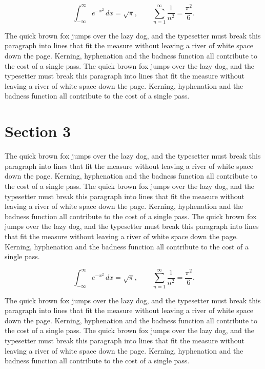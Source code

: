 \documentclass{article}
\begin{document}
\begin{equation}
\int_{-\infty}^{\infty} e^{-x^{2}}\,dx = \sqrt{\pi}, \qquad
\sum_{n=1}^{\infty} \frac{1}{n^{2}} = \frac{\pi^{2}}{6}.
\end{equation}

The quick brown fox jumps over the lazy dog, and the typesetter must break this paragraph into lines that fit the measure without leaving a river of white space down the page. Kerning, hyphenation and the badness function all contribute to the cost of a single pass. The quick brown fox jumps over the lazy dog, and the typesetter must break this paragraph into lines that fit the measure without leaving a river of white space down the page. Kerning, hyphenation and the badness function all contribute to the cost of a single pass. 
\section{Section 3}
The quick brown fox jumps over the lazy dog, and the typesetter must break this paragraph into lines that fit the measure without leaving a river of white space down the page. Kerning, hyphenation and the badness function all contribute to the cost of a single pass. The quick brown fox jumps over the lazy dog, and the typesetter must break this paragraph into lines that fit the measure without leaving a river of white space down the page. Kerning, hyphenation and the badness function all contribute to the cost of a single pass. The quick brown fox jumps over the lazy dog, and the typesetter must break this paragraph into lines that fit the measure without leaving a river of white space down the page. Kerning, hyphenation and the badness function all contribute to the cost of a single pass. 

\begin{equation}
\int_{-\infty}^{\infty} e^{-x^{2}}\,dx = \sqrt{\pi}, \qquad
\sum_{n=1}^{\infty} \frac{1}{n^{2}} = \frac{\pi^{2}}{6}.
\end{equation}

The quick brown fox jumps over the lazy dog, and the typesetter must break this paragraph into lines that fit the measure without leaving a river of white space down the page. Kerning, hyphenation and the badness function all contribute to the cost of a single pass. The quick brown fox jumps over the lazy dog, and the typesetter must break this paragraph into lines that fit the measure without leaving a river of white space down the page. Kerning, hyphenation and the badness function all contribute to the cost of a single pass. 
\end{document}
